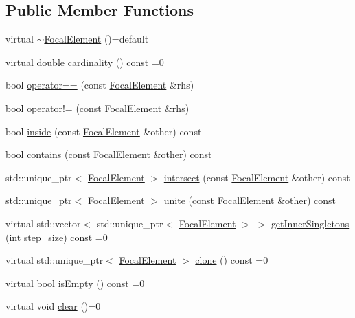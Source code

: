 \subsection*{Public Member Functions}
\begin{DoxyCompactItemize}
\item 
virtual \hyperlink{classFocalElement_a782f3f830a5cfa7242d519b8be3b4346}{$\sim$\+Focal\+Element} ()=default
\item 
virtual double \hyperlink{classFocalElement_a4ab1bbd0875e6e7ce2d7fe152e6a1639}{cardinality} () const =0
\item 
bool \hyperlink{classFocalElement_a431d66c098737bd6a64286a492b5ac65}{operator==} (const \hyperlink{classFocalElement}{Focal\+Element} \&rhs)
\item 
bool \hyperlink{classFocalElement_afde90486f09003215b51211c6546a9d3}{operator!=} (const \hyperlink{classFocalElement}{Focal\+Element} \&rhs)
\item 
bool \hyperlink{classFocalElement_aa1487ed49e7d203636edc8237322ed8b}{inside} (const \hyperlink{classFocalElement}{Focal\+Element} \&other) const 
\item 
bool \hyperlink{classFocalElement_acd424124e2ecff4b8c959d4874b89739}{contains} (const \hyperlink{classFocalElement}{Focal\+Element} \&other) const 
\item 
std\+::unique\+\_\+ptr$<$ \hyperlink{classFocalElement}{Focal\+Element} $>$ \hyperlink{classFocalElement_a2bb276626cceeca8f8ca46eafc923a04}{intersect} (const \hyperlink{classFocalElement}{Focal\+Element} \&other) const 
\item 
std\+::unique\+\_\+ptr$<$ \hyperlink{classFocalElement}{Focal\+Element} $>$ \hyperlink{classFocalElement_a533f16fbd5ae2b3d353d7c9a00bfb2c5}{unite} (const \hyperlink{classFocalElement}{Focal\+Element} \&other) const 
\item 
virtual std\+::vector$<$ std\+::unique\+\_\+ptr$<$ \hyperlink{classFocalElement}{Focal\+Element} $>$ $>$ \hyperlink{classFocalElement_ac615e960ea64a4bdc0f442135f6069e2}{get\+Inner\+Singletons} (int step\+\_\+size) const =0
\item 
virtual std\+::unique\+\_\+ptr$<$ \hyperlink{classFocalElement}{Focal\+Element} $>$ \hyperlink{classFocalElement_a21697fbbbcb144c18fa7b4ecae5e6145}{clone} () const =0
\item 
virtual bool \hyperlink{classFocalElement_aed131a65fdfc885019f9bf8f1d454508}{is\+Empty} () const =0
\item 
virtual void \hyperlink{classFocalElement_a635cb4afffa2dc69cf9fc9ff94a6d90f}{clear} ()=0
\end{DoxyCompactItemize}
